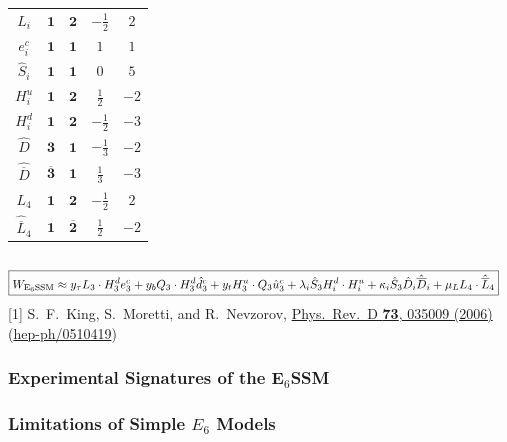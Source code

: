 \documentclass[10pt,aspectratio=169]{beamer}
\begin{document}
\begin{frame}
\begin{columns}[t]
\begin{column}{0.5\textwidth}
\begin{table}[h]
\begin{tabular}{ccccc}
            $L_i$ & $\mathbf{1}$ & $\mathbf{2}$ & $-\frac{1}{2}$ & $2$ \\
            $e_i^c$ & $\mathbf{1}$ & $\mathbf{1}$ & $1$ & $1$ \\
            $\hat{S}_i$ & $\mathbf{1}$ & $\mathbf{1}$ & $0$ & $5$ \\
            $H_i^u$ & $\mathbf{1}$ & $\mathbf{2}$ & $\frac{1}{2}$
            & $-2$ \\
            $H_i^d$ & $\mathbf{1}$ & $\mathbf{2}$ & $-\frac{1}{2}$
            & $-3$ \\
            $\hat{D}$ & $\mathbf{3}$ & $\mathbf{1}$ & $-\frac{1}{3}$ & $-2$ \\
            $\hat{\overline{D}}$ & $\mathbf{\overline{3}}$ &  $\mathbf{1}$
            & $\frac{1}{3}$ & $-3$ \\
            $L_4$ & $\mathbf{1}$ & $\mathbf{2}$ & $-\frac{1}{2}$ & $2$ \\
            $\hat{\overline{L}}_4$ & $\mathbf{1}$ & $\mathbf{\overline{2}}$
            & $\frac{1}{2}$ & $-2$ \\
            \bottomrule
          \end{tabular}
        \end{table}
      \end{column}
    \end{columns}
    \vspace{-4pt}
    \begin{align*}
      \Aboxed{W_{\text{E}_6\text{SSM}} \approx y_{\tau} L_3 \cdot
        H^d_3 e^c_3 + y_b Q_3 \cdot H^d_3 \hat{d}_3^c
        + y_t H^u_3 \cdot Q_3 \hat{u}_3^c + \lambda_i \hat{S}_3
        H_i^d \cdot H_i^u  + \kappa_i \hat{S}_3 \hat{D}_i
        \hat{\overline{D}}_i + \mu_L L_4 \cdot \hat{\overline{L}}_4}
    \end{align*}
        {\tiny [1] S.~F.~King, S.~Moretti, and R.~Nevzorov,
          \href{http://dx.doi.org/10.1103/PhysRevD.73.035009}{Phys.~Rev.~D
            \textbf{73}, 035009 (2006)}
          (\href{http://arxiv.org/abs/hep-ph/0510419}{hep-ph/0510419})}
\end{frame}

\begin{frame}
  \frametitle{Experimental Signatures of the E$_6$SSM}
\end{frame}

\begin{frame}
  \frametitle{Limitations of Simple $E_6$ Models}
\end{frame}
\end{document}
